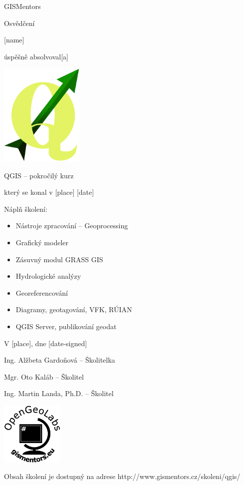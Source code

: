 \documentclass[12pt, a4paper]{letter}
\begin{document}
\pagestyle{empty}
\begin{center}

{\Large GISMentors}

{\Huge Osvědčení}

{\Large [name]}

úspěšně absolvoval[a]

\includegraphics[width=0.30\textwidth]{../images/qgislogo_vector.eps}

{\Large QGIS -- pokročilý kurz}

který se konal v [place] [date]
\end{center}

Náplň školení:

\begin{itemize}
    \item Nástroje zpracování -- Geoprocessing
    \item Grafický modeler
    \item Zásuvný modul GRASS GIS
    \item Hydrologické analýzy
    \item Georeferencování
    \item Diagramy, geotagování, VFK, RÚIAN
    \item QGIS Server, publikování geodat
\end{itemize}

\vfill
\parbox{7cm}{

    V [place], dne [date-signed]\\

\vfill

    Ing. Alžbeta Gardoňová -- Školitelka\\

\vfill
    
    Mgr. Oto Kaláb -- Školitel \\

\vfill
    
    Ing. Martin Landa, Ph.D. -- Školitel

}
\hfill
\parbox{3cm}{
    \includegraphics[width=3cm]{../images/placka.eps}
}


\begin{center}
{\footnotesize Obsah školení je dostupný na adrese
http://www.gismentors.cz/skoleni/qgis/}
\end{center}
\end{document}
